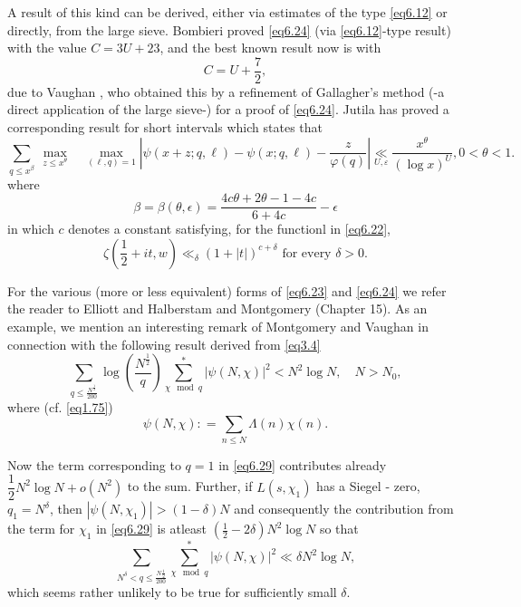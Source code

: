 A result of this kind can be derived, either via estimates of the type
\eqref{eq6.12} or directly, from the large sieve. Bombieri proved
\eqref{eq6.24} (via \eqref{eq6.12}-type result) with the value $C = 3U
+ 23$, and the best known result now is with 
\begin{equation*}
C = U  + \frac{7}{2}, \tag{6.25}\label{eq6.25} 
\end{equation*}
due to Vaughan \cite{key6}, who obtained this by a refinement of Gallagher's
\cite{key2} method (-a direct application of the large sieve-) for a proof
of \eqref{eq6.24}. 
Jutila\pageoriginale \cite{key1} has proved a corresponding result for short
intervals which states that 
\begin{equation*}
\sum_{q\leq x^\beta} ~ \underset{z\leq x^{\theta}}{\max}\quad
\underset{(\ell,q) =1}{\max} | \psi (x+z;q,\ell ) - \psi(x;q,\ell) -
\frac{z}{\varphi (q)} | \underset{U,\varepsilon}{\ll}
\frac{x^{\theta}}{(\log x)^{U}},0 < \theta <
1. \tag{6.26}\label{eq6.26}   
\end{equation*}
where 
\begin{equation*}
\beta = \beta (\theta ,\epsilon) = \frac{4c\theta + 2\theta -1
  -4c}{6+4c} - \epsilon \tag{6.27}\label{eq6.27}  
\end{equation*}
in which $c$ denotes a constant satisfying, for the functionl in
\eqref{eq6.22}, 
\begin{equation*}
\zeta(\frac{1}{2}+ it,w) \ll_{\delta}(1+|t|)^{c+\delta}\text{ for
  every }\delta > 0. \tag{6.28}\label{eq6.28}  
\end{equation*}

For the various (more or less equivalent) forms of \eqref{eq6.23} and
\eqref{eq6.24} we refer the reader to Elliott and Halberstam \cite{key2} and
Montgomery \cite{key5} (Chapter 15). As an example, we mention an
interesting remark of Montgomery and Vaughan \cite{key2} in connection with
the following result derived from \eqref{eq3.4} 
\begin{equation*}
\sum_{q \leq \frac{N^{\frac{1}{2}}}{200}} \log
(\frac{N^{\frac{1}{2}}}{q})\sum_{\chi \mod q}^* | \psi (N,\chi ) |^2 <
N^2 \log N, \quad N > N_0, \tag{6.29}\label{eq6.29}  
\end{equation*}
where (cf. \eqref{eq1.75})
\begin{equation*}
\psi (N,\chi ) : = \sum_{n\leq N} \Lambda (n) \chi
(n). \tag{6.30}\label{eq6.30}   
\end{equation*}

Now the term corresponding to $q = 1$ in \eqref{eq6.29} contributes already
$\dfrac{1}{2}N^2 \log N + o (N^2)$ to the sum. Further, if
$L(s,\chi_1)$ has a Siegel - zero, $q_1 = N^{\delta}$, then
$|\psi(N,\chi_1)| > (1 - \delta) N $ and consequently the contribution
from the term for $\chi_1$ in \eqref{eq6.29} is atleast $(\frac{1}{2} - 2
\delta ) N^2 \log N$ so that 
\begin{equation*}
\sum_{N^{\delta}< q \leq \frac{N \frac{1}{2}}{200}} \sum_{\chi \mod q}^*
| \psi (N, \chi ) |^2 \ll \delta N^2 \log N, \tag{6.31}\label{eq6.31}  
\end{equation*}
which seems rather unlikely to be true for sufficiently small
$\delta$. 

